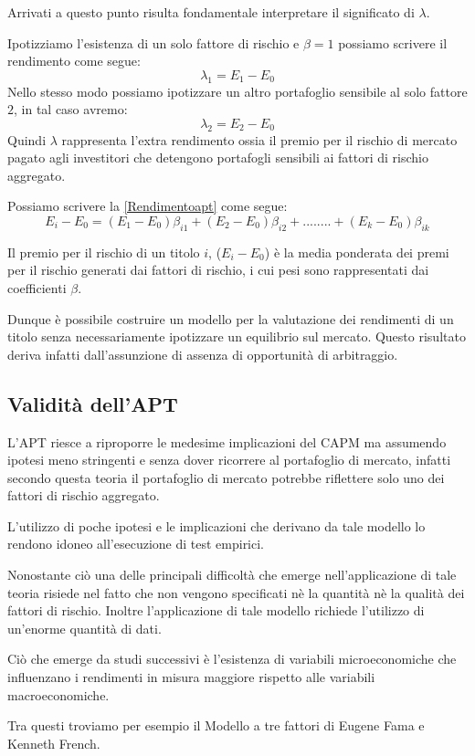 Arrivati a questo punto risulta fondamentale interpretare il significato di $\lambda$.

Ipotizziamo l'esistenza di un solo fattore di rischio e $\beta=1$ possiamo scrivere il rendimento come segue: 
\begin{equation}
\lambda_1=E_1-E_0 
\end{equation}
Nello stesso modo possiamo ipotizzare un altro portafoglio sensibile al solo fattore $2$, in tal caso avremo: 
\begin{equation}
\lambda_2=E_2-E_0 
\end{equation}
Quindi $\lambda$ rappresenta l'extra rendimento ossia il premio per il rischio di mercato pagato agli investitori che detengono portafogli sensibili ai fattori di rischio aggregato.

Possiamo scrivere la \ref{Rendimentoapt} come segue: 
\begin{equation}
E_i-E_0=(E_1-E_0)\beta_{i1}+(E_2-E_0)\beta_{i2}+........+(E_k-E_0) \beta_{ik}
\end{equation}

Il premio per il rischio di un titolo $i$, ($E_i-E_0$) è la media ponderata dei premi per il rischio generati dai fattori di rischio, i cui pesi sono rappresentati dai coefficienti $\beta$.

Dunque è possibile costruire un modello per la valutazione dei rendimenti di un titolo senza necessariamente ipotizzare un equilibrio sul mercato. Questo risultato deriva infatti dall'assunzione di assenza di opportunità di arbitraggio.

\subsection{Validità dell'APT}
L'APT riesce a riproporre le medesime implicazioni del CAPM ma assumendo ipotesi meno stringenti e senza dover ricorrere al portafoglio di mercato, infatti secondo questa teoria il portafoglio di mercato potrebbe riflettere solo uno dei fattori di rischio aggregato. 

L'utilizzo di poche ipotesi e le implicazioni che derivano da tale modello lo rendono idoneo all'esecuzione di test empirici.

Nonostante ciò una delle principali difficoltà che emerge nell'applicazione di tale teoria risiede nel fatto che non vengono specificati nè la quantità nè la qualità dei fattori di rischio. Inoltre l'applicazione di tale modello richiede l'utilizzo di un'enorme quantità di dati.

Ciò che emerge da studi successivi è l'esistenza di variabili  microeconomiche che influenzano i rendimenti in misura maggiore rispetto alle variabili macroeconomiche. 

Tra questi troviamo per esempio il Modello a tre fattori di Eugene Fama e Kenneth French. 








